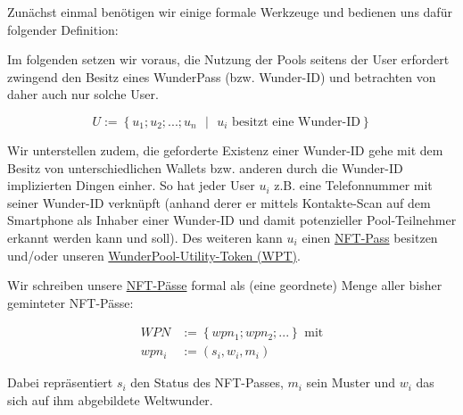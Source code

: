
Zunächst einmal benötigen wir einige formale Werkzeuge und bedienen uns dafür folgender Definition:

\vspace{0.2cm}

\begin{Def}\label{defPoolTeilnehmer}

Im folgenden setzen wir voraus, die Nutzung der Pools seitens der User erfordert zwingend den Besitz eines WunderPass (bzw. Wunder-ID) und betrachten von daher auch nur solche User.

\begin{equation*}
  U := \left\{ u_1; u_2;...; u_{n} \text{ } | \text{ } u_i \text{ besitzt eine Wunder-ID} \right\}
\end{equation*}

\vspace{0.2cm}

Wir unterstellen zudem, die geforderte Existenz einer Wunder-ID gehe mit dem Besitz von unterschiedlichen Wallets bzw. anderen durch die Wunder-ID implizierten Dingen einher. So hat jeder User $u_i$ z.B. eine Telefonnummer mit seiner Wunder-ID verknüpft (anhand derer er mittels Kontakte-Scan auf dem Smartphone als Inhaber einer Wunder-ID und damit potenzieller Pool-Teilnehmer erkannt werden kann und soll). Des weiteren kann $u_i$ einen \href{https://github.com/WunderPass/White-Paper/blob/main/nft.pdf}{NFT-Pass} besitzen und/oder unseren \href{https://github.com/WunderPass/White-Paper/blob/main/pools-economics.pdf}{WunderPool-Utility-Token (WPT)}. 

\vspace{0.2cm}

Wir schreiben unsere \href{https://github.com/WunderPass/White-Paper/blob/main/nft.pdf}{NFT-Pässe} formal als (eine geordnete) Menge aller bisher geminteter NFT-Pässe:

\begin{align*}
  WPN &:= \left\{ wpn_1; wpn_2;... \right\} \text{ mit} \\
  wpn_i &:= (s_i, w_i, m_i)
\end{align*}

\vspace{0.2cm}

Dabei repräsentiert $s_i$ den Status des NFT-Passes, $m_i$ sein Muster und $w_i$ das sich auf ihm abgebildete Weltwunder.

\vspace{0.2cm}


\end{Def}
